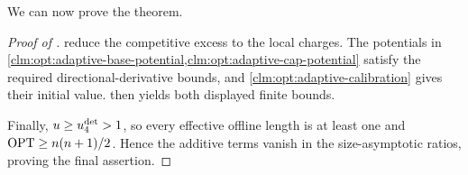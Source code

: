 We can now prove the theorem.

\begin{proof}[Proof of ]
reduce the competitive excess to the local charges.  The potentials in
\cref{clm:opt:adaptive-base-potential,clm:opt:adaptive-cap-potential} satisfy
the required directional-derivative bounds, and
\cref{clm:opt:adaptive-calibration} gives their initial value.
 then yields both displayed finite bounds.

Finally, $u\ge u_{4}^{\mathrm{det}}>1$, so every effective offline length is at least one
and $\operatorname{OPT}\ge n(n+1)/2$.  Hence the additive terms vanish in the
size-asymptotic ratios, proving the final assertion.
\end{proof}

